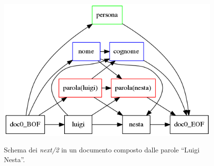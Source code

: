 \begin{figure}[H]
\centering
\includegraphics[width=\textwidth]{img/nuovitag.png}
\label{fig:nuovitag}
\caption{Schema dei \emph{next/2} in un documento composto dalle parole ``Luigi Nesta''.}
\end{figure}
